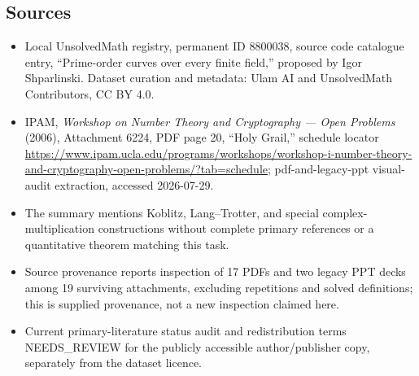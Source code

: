 \documentclass[11pt]{article}
\begin{document}
\subsection{Sources}
\begin{itemize}
\item Local UnsolvedMath registry, permanent ID 8800038, source code catalogue entry, ``Prime-order curves over every finite field,'' proposed by Igor Shparlinski. Dataset curation and metadata: Ulam AI and UnsolvedMath Contributors, CC BY 4.0.
\item IPAM, \emph{Workshop on Number Theory and Cryptography --- Open Problems} (2006), Attachment 6224, PDF page 20, ``Holy Grail,'' schedule locator \url{https://www.ipam.ucla.edu/programs/workshops/workshop-i-number-theory-and-cryptography-open-problems/?tab=schedule}; pdf-and-legacy-ppt visual-audit extraction, accessed 2026-07-29.
\item The summary mentions Koblitz, Lang--Trotter, and special complex-multiplication constructions without complete primary references or a quantitative theorem matching this task.
\item Source provenance reports inspection of 17 PDFs and two legacy PPT decks among 19 surviving attachments, excluding repetitions and solved definitions; this is supplied provenance, not a new inspection claimed here.
\item Current primary-literature status audit and redistribution terms NEEDS\_REVIEW for the publicly accessible author/publisher copy, separately from the dataset licence.
\end{itemize}
\end{document}
